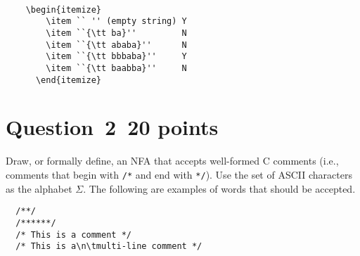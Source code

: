 \documentclass[10pt]{article}
\begin{document}
\begin{Verbatim}[frame=single]

	\begin{itemize}
		\item `` '' (empty string) Y
		\item ``{\tt ba}''         N
		\item ``{\tt ababa}''      N
		\item ``{\tt bbbaba}''     Y
		\item ``{\tt baabba}''     N
	  \end{itemize}

\end{Verbatim}
\section*{Question~2~\hfill 20 points}

Draw, or formally define, 
an NFA that accepts well-formed C comments
(i.e., comments that begin with \verb|/*|
and end with \verb|*/|).
Use the set of ASCII characters as the alphabet $\Sigma$.
The following are examples of words that should be accepted.
\begin{verbatim}
  /**/
  /******/
  /* This is a comment */
  /* This is a\n\tmulti-line comment */
\end{verbatim}

\begin{center}
\end{center}
\end{document}
